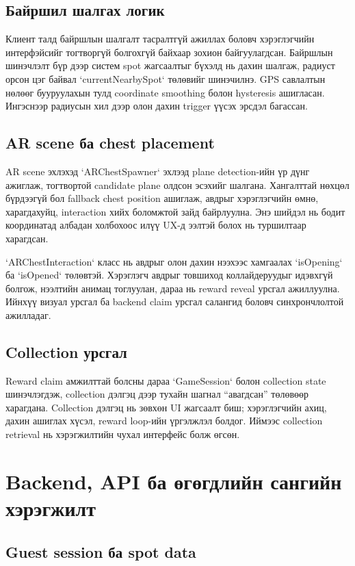 \begin{sloppy}
\subsection{Байршил шалгах логик}

Клиент талд байршлын шалгалт тасралтгүй ажиллах боловч хэрэглэгчийн интерфэйсийг тогтворгүй болгохгүй байхаар зохион байгуулагдсан. Байршлын шинэчлэлт бүр дээр систем spot жагсаалтыг бүхэлд нь дахин шалгаж, радиуст орсон цэг байвал `currentNearbySpot` төлөвийг шинэчилнэ. GPS савлалтын нөлөөг бууруулахын тулд coordinate smoothing болон hysteresis ашигласан. Ингэснээр радиусын хил дээр олон дахин trigger үүсэх эрсдэл багассан.

\subsection{AR scene ба chest placement}

AR scene эхлэхэд `ARChestSpawner` эхлээд plane detection-ийн үр дүнг ажиглаж, тогтвортой candidate plane олдсон эсэхийг шалгана. Хангалттай нөхцөл бүрдээгүй бол fallback chest position ашиглаж, авдрыг хэрэглэгчийн өмнө, харагдахуйц, interaction хийх боломжтой зайд байрлуулна. Энэ шийдэл нь бодит координатад албадан холбохоос илүү UX-д ээлтэй болох нь туршилтаар харагдсан.

`ARChestInteraction` класс нь авдрыг олон дахин нээхээс хамгаалах `isOpening` ба `isOpened` төлөвтэй. Хэрэглэгч авдрыг товшиход коллайдеруудыг идэвхгүй болгож, нээлтийн анимац тоглуулан, дараа нь reward reveal урсгал ажиллуулна. Ийнхүү визуал урсгал ба backend claim урсгал салангид боловч синхрончлолтой ажилладаг.

\subsection{Collection урсгал}

Reward claim амжилттай болсны дараа `GameSession` болон collection state шинэчлэгдэж, collection дэлгэц дээр тухайн шагнал ``авагдсан'' төлөвөөр харагдана. Collection дэлгэц нь зөвхөн UI жагсаалт биш; хэрэглэгчийн ахиц, дахин ашиглах хүсэл, reward loop-ийн үргэлжлэл болдог. Иймээс collection retrieval нь хэрэгжилтийн чухал интерфейс болж өгсөн.

\section{Backend, API ба өгөгдлийн сангийн хэрэгжилт}

\subsection{Guest session ба spot data}


\end{sloppy}
